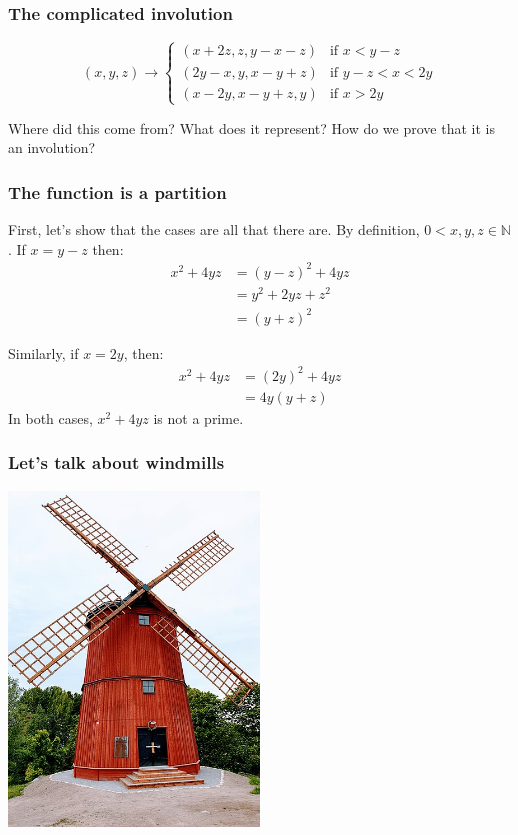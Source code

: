 \documentclass{beamer}
\begin{document}
\begin{frame}
	\frametitle{The complicated involution}

	\begin{equation*}
		(x,y,z) \rightarrow
		\begin{cases}
			(x + 2z, z, y - x - z) & \text{if } x < y-z \\
			(2y - x, y, x - y + z) & \text{if } y - z < x < 2y \\
			(x - 2y, x - y + z, y) & \text{if } x > 2y
		\end{cases}
	\end{equation*}

	Where did this come from? What does it represent? How do we prove that it is an involution?
\end{frame}

\begin{frame}
	\frametitle{The function is a partition}

	First, let's show that the cases are all that there are. By definition,
	$0<x,y,z \in \mathbb{N}$. If $x = y-z$ then:
	\begin{align*}
		x^2 + 4yz &= (y-z)^2 + 4yz \\
		&= y^2+2yz+z^2 \\
		&= (y+z)^2
	\end{align*}

	Similarly, if $x=2y$, then:
	\begin{align*}
		x^2 + 4yz &= (2y)^2 + 4yz \\
		&= 4y(y+z)
	\end{align*}
	In both cases, $x^2+4yz$ is not a prime.

\end{frame}

\begin{frame}
	\frametitle{Let's talk about windmills}
	\begin{center}
             \includegraphics[width=0.5\textwidth]{windmill.jpg}
        \end{center}
\end{frame}
\end{document}

